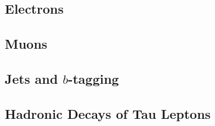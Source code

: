 \subsection{Electrons}

\subsection{Muons}

\subsection{Jets and $b$-tagging}

\subsection{Hadronic Decays of Tau Leptons}

